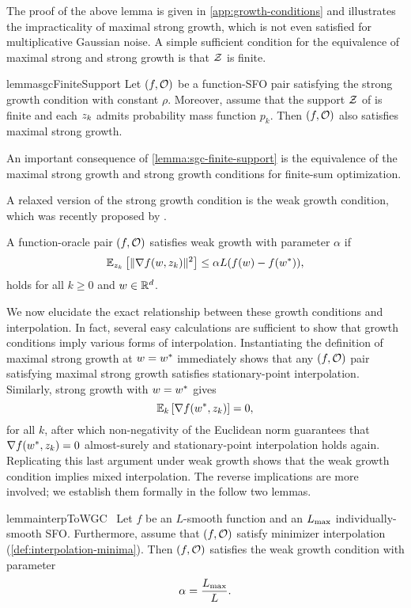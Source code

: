 The proof of the above lemma is given in \autoref{app:growth-conditions} and illustrates the impracticality of maximal strong growth, which is not even satisfied for multiplicative Gaussian noise.
A simple sufficient condition for the equivalence of maximal strong and strong growth is that \( \calZ \) is finite.
\begin{restatable}{lemma}{sgcFiniteSupport}\label{lemma:sgc-finite-support}
    Let \( \rbr{f, \oracle{}} \) be a function-\ac{SFO} pair satisfying the strong growth condition with constant \( \rho \).
    Moreover, assume that the support \( \calZ \) of \oracle{} is finite and each \( \zk \) admits probability mass function \( p_k \). 
    Then \( \rbr{f, \oracle{}} \) also satisfies maximal strong growth.
\end{restatable}
An important consequence of \autoref{lemma:sgc-finite-support} is the equivalence of the maximal strong growth and strong growth conditions for finite-sum optimization.

A relaxed version of the strong growth condition is the weak growth condition, which was recently proposed by \citet{vaswani2019fast}.
\begin{definition}\label{def:wgc}
    A function-oracle pair \( \rbr{f, \oracle{}} \) satisfies weak growth with parameter \(\alpha \) if
    \[ \Ek \sbr{\norm{\grad(\w, \zk)}^2} \leq \alpha L (f(\w) - f(\wopt)), \]
    holds for all \( k \geq 0 \) and \( \w \in \R^d\).
\end{definition}

We now elucidate the exact relationship between these growth conditions and interpolation.
In fact, several easy calculations are sufficient to show that growth conditions imply various forms of interpolation.
Instantiating the definition of maximal strong growth at \( \w = \wopt \) immediately shows that any \( \rbr{f, \oracle{}} \) pair satisfying maximal strong growth satisfies stationary-point interpolation.
Similarly, strong growth with \( \w = \wopt \) gives  
\[ \E_k\sbr{\grad(\wopt, \zk)} = 0, \] 
for all \( k \), after which non-negativity of the Euclidean norm guarantees that \( \grad(\wopt, \zk) = 0 \) almost-surely and stationary-point interpolation holds again.
Replicating this last argument under weak growth shows that the weak growth condition implies mixed interpolation.
The reverse implications are more involved; we establish them formally in the follow two lemmas. 
\begin{restatable}{lemma}{interpToWGC}~\label{lemma:interpolation-to-wgc}
    Let \( f \) be an \( L \)-smooth function and \oracle{} an \( \Lmax \) individually-smooth \ac{SFO}.
    Furthermore, assume that \( \rbr{f, \oracle{}} \) satisfy minimizer interpolation (\autoref{def:interpolation-minima}).
    Then \( \rbr{f, \oracle{}} \) satisfies the weak growth condition with parameter
    \[ \wgc = \frac{L_{\text{max}}}{L}. \]
\end{restatable}

